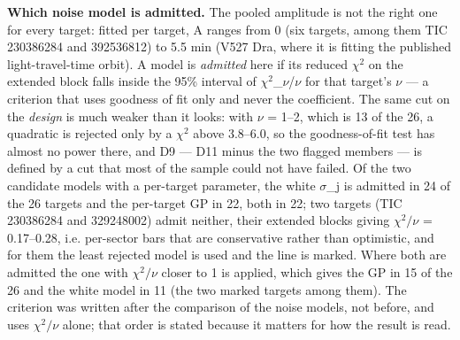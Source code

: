 \documentclass{aa}
\begin{document}
\textbf{Which noise model is admitted.} The pooled amplitude is not the right one for every target: fitted per target, A ranges from 0 (six targets, among them TIC 230386284 and 392536812) to 5.5 min (V527 Dra, where it is fitting the published light-travel-time orbit). A model is \textit{admitted} here if its reduced $\chi^2$ on the extended block falls inside the 95\% interval of $\chi^2$\_$\nu$/$\nu$ for that target's $\nu$ --- a criterion that uses goodness of fit only and never the coefficient. The same cut on the \textit{design} is much weaker than it looks: with $\nu$ = 1--2, which is 13 of the 26, a quadratic is rejected only by a $\chi^2$ above 3.8--6.0, so the goodness-of-fit test has almost no power there, and D9 --- D11 minus the two flagged members --- is defined by a cut that most of the sample could not have failed. Of the two candidate models with a per-target parameter, the white $\sigma$\_j is admitted in 24 of the 26 targets and the per-target GP in 22, both in 22; two targets (TIC 230386284 and 329248002) admit neither, their extended blocks giving $\chi^2/\nu$ = 0.17--0.28, i.e. per-sector bars that are conservative rather than optimistic, and for them the least rejected model is used and the line is marked. Where both are admitted the one with $\chi^2/\nu$ closer to 1 is applied, which gives the GP in 15 of the 26 and the white model in 11 (the two marked targets among them). The criterion was written after the comparison of the noise models, not before, and uses $\chi^2/\nu$ alone; that order is stated because it matters for how the result is read.
\end{document}
